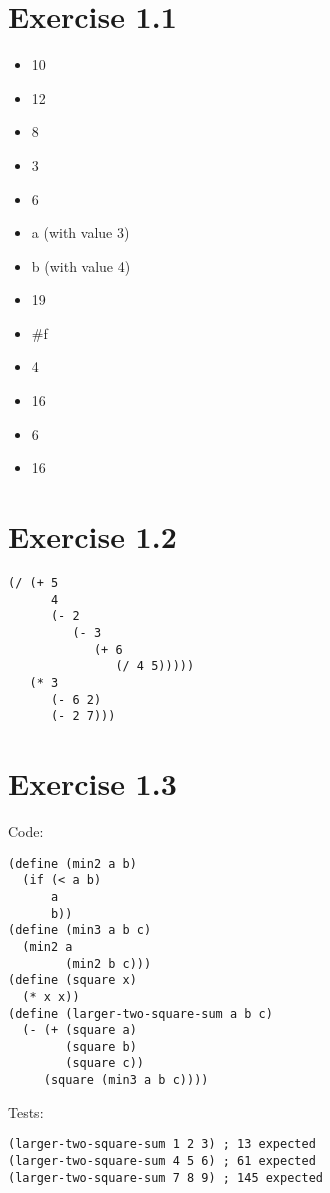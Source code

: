 \documentclass[../main.tex]{subfiles}
\begin{document}
\section{Exercise 1.1}

\begin{multicols}{2}
  \begin{itemize}
    \item 10
    \item 12
    \item 8
    \item 3
    \item 6
    \item a (with value 3)
    \item b (with value 4)
    \item 19
    \item \#f
    \item 4
    \item 16
    \item 6
    \item 16
  \end{itemize}
\end{multicols}

\section{Exercise 1.2}

\begin{lstlisting}
(/ (+ 5
      4
      (- 2
         (- 3
            (+ 6
               (/ 4 5)))))
   (* 3
      (- 6 2)
      (- 2 7)))
\end{lstlisting}

\section{Exercise 1.3}

Code:

\begin{lstlisting}
(define (min2 a b)
  (if (< a b)
      a
      b))
(define (min3 a b c)
  (min2 a
        (min2 b c)))
(define (square x)
  (* x x))
(define (larger-two-square-sum a b c)
  (- (+ (square a)
        (square b)
        (square c))
     (square (min3 a b c))))
\end{lstlisting}

Tests:

\begin{lstlisting}
(larger-two-square-sum 1 2 3) ; 13 expected
(larger-two-square-sum 4 5 6) ; 61 expected
(larger-two-square-sum 7 8 9) ; 145 expected
\end{lstlisting}
\end{document}
